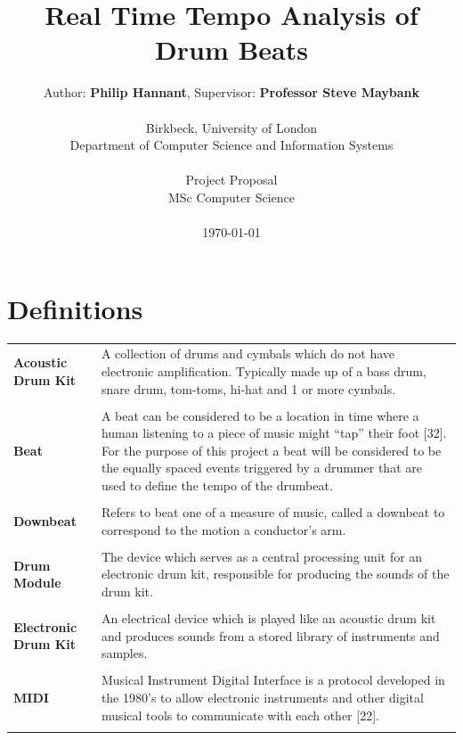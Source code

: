 \documentclass[a4paper, 11pt]{article}
\date{}
\begin{document}
 

\LARGE\title{Real Time Tempo Analysis of Drum Beats}

\LARGE\author{Author: \textbf{Philip Hannant}, Supervisor: \textbf{Professor Steve Maybank}\\
\\Birkbeck, University of London\\
Department of Computer Science and Information Systems\\
\\Project Proposal\\
MSc Computer Science\\
\\\monthyeardate\today
}





\normalsize


\maketitle
\newpage
\tableofcontents
\clearpage

\section*{Definitions}
\begin{tabular}{l p{4.5in}  }
\textbf{Acoustic Drum Kit} & A collection of drums and cymbals which do not have electronic amplification. Typically made up of a bass drum, snare drum, tom-toms, hi-hat and 1 or more cymbals.\\\\
\textbf{Beat} & A beat can be considered to be a location in time where a human listening to a piece of music might ``tap'' their foot [32]. For the purpose of this project a beat will be considered to be the equally spaced events triggered by a drummer that are used to define the tempo of the drumbeat.\\\\
\textbf{Downbeat} & Refers to beat one of a measure of music, called a downbeat to correspond to the motion a conductor's arm.\\\\
\textbf{Drum Module} & The device which serves as a central processing unit for an electronic drum kit, responsible for producing the sounds of the drum kit.\\\\
\textbf{Electronic Drum Kit} & An electrical device which is played like an acoustic drum kit and produces sounds from a stored library of instruments and samples.\\\\
\textbf{MIDI} & Musical Instrument Digital Interface is a protocol developed in the 1980's to allow electronic instruments and other digital musical tools to communicate with each other [22].\\\\
\end{tabular}
\clearpage
\end{document}
